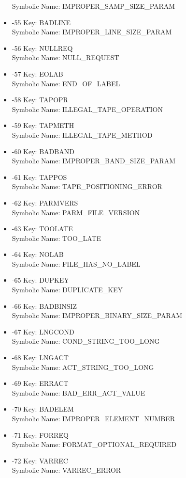 \begin{itemize}
Symbolic Name: IMPROPER\_SAMP\_SIZE\_PARAM
\item -55 Key: BADLINE \\
Symbolic Name: IMPROPER\_LINE\_SIZE\_PARAM
\item -56 Key: NULLREQ \\
Symbolic Name: NULL\_REQUEST
\item -57 Key: EOLAB \\
Symbolic Name: END\_OF\_LABEL
\item -58 Key: TAPOPR \\
Symbolic Name: ILLEGAL\_TAPE\_OPERATION
\item -59 Key: TAPMETH \\
Symbolic Name: ILLEGAL\_TAPE\_METHOD
\item -60 Key: BADBAND \\
Symbolic Name: IMPROPER\_BAND\_SIZE\_PARAM
\item -61 Key: TAPPOS \\
Symbolic Name: TAPE\_POSITIONING\_ERROR
\item -62 Key: PARMVERS \\
Symbolic Name: PARM\_FILE\_VERSION
\item -63 Key: TOOLATE \\
Symbolic Name: TOO\_LATE
\item -64 Key: NOLAB \\
Symbolic Name: FILE\_HAS\_NO\_LABEL
\item -65 Key: DUPKEY \\
Symbolic Name: DUPLICATE\_KEY
\item -66 Key: BADBINSIZ \\
Symbolic Name: IMPROPER\_BINARY\_SIZE\_PARAM
\item -67 Key: LNGCOND \\
Symbolic Name: COND\_STRING\_TOO\_LONG
\item -68 Key: LNGACT \\
Symbolic Name: ACT\_STRING\_TOO\_LONG
\item -69 Key: ERRACT \\
Symbolic Name: BAD\_ERR\_ACT\_VALUE
\item -70 Key: BADELEM \\
Symbolic Name: IMPROPER\_ELEMENT\_NUMBER
\item -71 Key: FORREQ \\
Symbolic Name: FORMAT\_OPTIONAL\_REQUIRED
\item -72 Key: VARREC \\
Symbolic Name: VARREC\_ERROR

\end{itemize}
